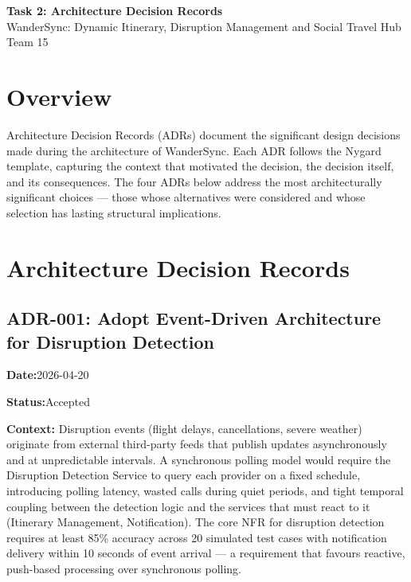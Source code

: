 \documentclass[12pt,a4paper]{article}
\newcommand{\adrfield}[2]{%
  \noindent\textbf{#1:}\hspace{0.5em}#2\par\vspace{0.3em}%
}
\begin{document}
\begin{center}
  {\LARGE\bfseries Task 2: Architecture Decision Records}\\[0.4em]
  {\large WanderSync: Dynamic Itinerary, Disruption Management and Social Travel Hub}\\[0.2em]
  {\normalsize Team 15}
\end{center}

\vspace{1em}

\section{Overview}

Architecture Decision Records (ADRs) document the significant design decisions made during the
architecture of WanderSync. Each ADR follows the Nygard template, capturing the context that
motivated the decision, the decision itself, and its consequences. The four ADRs below address the
most architecturally significant choices — those whose alternatives were considered and whose
selection has lasting structural implications.

\section{Architecture Decision Records}

\subsection{ADR-001: Adopt Event-Driven Architecture for Disruption Detection}

\begin{mdframed}[backgroundcolor=adrbox, linecolor=accent, linewidth=0.8pt]
\adrfield{Date}{2026-04-20}
\adrfield{Status}{Accepted}
\end{mdframed}

\vspace{0.5em}

\adrfield{Context}{
  Disruption events (flight delays, cancellations, severe weather) originate from external
  third-party feeds that publish updates asynchronously and at unpredictable intervals. A
  synchronous polling model would require the Disruption Detection Service to query each provider
  on a fixed schedule, introducing polling latency, wasted calls during quiet periods, and tight
  temporal coupling between the detection logic and the services that must react to it (Itinerary
  Management, Notification). The core NFR for disruption detection requires at least 85\% accuracy
  across 20 simulated test cases with notification delivery within 10 seconds of event arrival —
  a requirement that favours reactive, push-based processing over synchronous polling.
}
\end{document}
